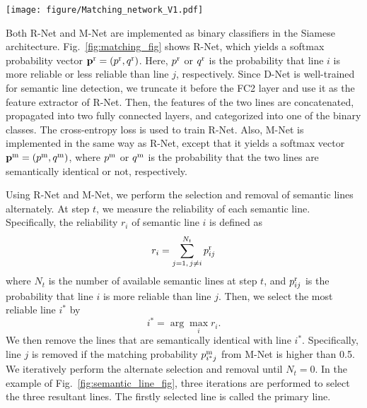 \documentclass[runningheads]{llncs}
\begin{document}
\begin{figure*}[t]

  \centering
  \texttt{[image: figure/Matching\_network\_V1.pdf]}
\caption{Siamese architecture for R-Net: Given a pair of detected lines from D-Net, R-Net decides whether one line is more reliable or less reliable than the other.}
  \label{fig:matching_fig}
\end{figure*}


Both R-Net and M-Net are implemented as binary classifiers in the Siamese architecture. Fig.~\ref{fig:matching_fig} shows R-Net, which yields a softmax probability vector ${\bf p}^{\rm r}=(p^{\rm r}, q^{\rm r})$. Here, $p^{\rm r}$ or $q^{\rm r}$ is the probability that line $i$ is more reliable or less reliable than line $j$, respectively. Since D-Net is well-trained for semantic line detection, we truncate it before the FC2 layer and use it as the feature extractor of R-Net. Then, the features of the two lines are concatenated, propagated into two fully connected layers, and categorized into one of the binary classes. The cross-entropy loss is used to train R-Net. Also, M-Net is implemented in the same way as R-Net, except that it yields a softmax vector ${\bf p}^{\rm m}=(p^{\rm m}, q^{\rm m})$, where $p^{\rm m}$ or $q^{\rm m}$ is the probability that the two lines are semantically identical or not, respectively.

Using R-Net and M-Net, we perform the selection and removal of semantic lines alternately. At step $t$, we measure the reliability of each semantic line. Specifically, the reliability $r_i$ of semantic line $i$ is defined as
\begin{equation}\label{eq:reliabilty}
    r_i = \sum_{j=1,\, j\neq i}^{N_t} p^{\rm r}_{ij}
\end{equation}
where $N_t$ is the number of available semantic lines at step $t$, and $p_{ij}^{\rm r}$ is the probability that line $i$ is more reliable than line $j$. Then, we select the most reliable line $i^*$ by
\begin{equation}\label{eq:top_rank}
    i^* = \arg \max_i r_i.
\end{equation}
We then remove the lines that are semantically identical with line $i^*$. Specifically, line $j$ is removed if the matching probability $p_{i^* j}^{\rm m}$ from M-Net is higher than 0.5. We iteratively perform the alternate selection and removal until $N_t=0$. In the example of Fig.~\ref{fig:semantic_line_fig}, three iterations are performed to select the three resultant lines. The firstly selected line is called the primary line.
\end{document}
